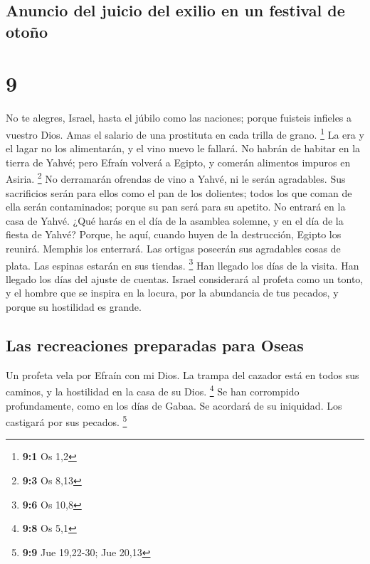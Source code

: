 \begin{paracol}{2}
{\subsection{Anuncio del juicio del exilio en un festival de
otoño}\label{anuncio-del-juicio-del-exilio-en-un-festival-de-otouxf1o}}

\hypertarget{section-16}{%
\section{9}\label{section-16}}

 No te alegres, Israel, hasta el júbilo como las naciones;
porque fuisteis infieles a vuestro Dios. Amas el salario de una
prostituta en cada trilla de grano. \footnote{\textbf{9:1} Os 1,2}
 La era y el lagar no los alimentarán, y el vino nuevo le
fallará.  No habrán de habitar en la tierra de Yahvé; pero
Efraín volverá a Egipto, y comerán alimentos impuros en Asiria.
\footnote{\textbf{9:3} Os 8,13}  No derramarán ofrendas de
vino a Yahvé, ni le serán agradables. Sus sacrificios serán para ellos
como el pan de los dolientes; todos los que coman de ella serán
contaminados; porque su pan será para su apetito. No entrará en la casa
de Yahvé.  ¿Qué harás en el día de la asamblea solemne, y
en el día de la fiesta de Yahvé?  Porque, he aquí, cuando
huyen de la destrucción, Egipto los reunirá. Memphis los enterrará. Las
ortigas poseerán sus agradables cosas de plata. Las espinas estarán en
sus tiendas. \footnote{\textbf{9:6} Os 10,8}  Han llegado
los días de la visita. Han llegado los días del ajuste de cuentas.
Israel considerará al profeta como un tonto, y el hombre que se inspira
en la locura, por la abundancia de tus pecados, y porque su hostilidad
es grande.

\hypertarget{las-recreaciones-preparadas-para-oseas}{%
\subsection{Las recreaciones preparadas para
Oseas}\label{las-recreaciones-preparadas-para-oseas}}

 Un profeta vela por Efraín con mi Dios. La trampa del
cazador está en todos sus caminos, y la hostilidad en la casa de su
Dios. \footnote{\textbf{9:8} Os 5,1}  Se han corrompido
profundamente, como en los días de Gabaa. Se acordará de su iniquidad.
Los castigará por sus pecados. \footnote{\textbf{9:9} Jue 19,22-30; Jue
  20,13}


\end{paracol}
